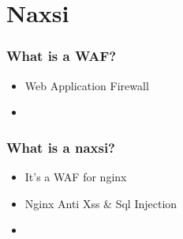 \section{Naxsi}

\begin{frame}
  \frametitle{What is a WAF?}
   \begin{itemize}
   \item Web Application Firewall 
   \item 
  \end{itemize}
\end{frame}

\begin{frame}
  \frametitle{What is a naxsi?}
   \begin{itemize}
   \item It's a WAF for nginx
   \item Nginx Anti Xss \& Sql Injection
   \item
  \end{itemize}
\end{frame}

